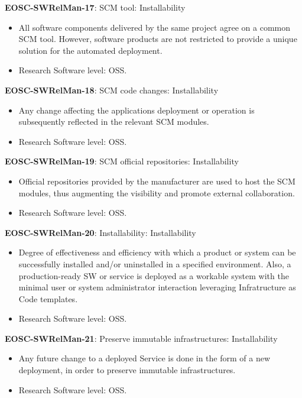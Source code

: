 \textbf{EOSC-SWRelMan-17}: SCM tool: Installability

\begin{itemize}
    \item All software components delivered by the same project agree on a common SCM tool. However, software products are not restricted to provide a unique solution for the automated deployment. \cite{orviz_set_2017}
    \item Research Software level: OSS.
\end{itemize}

\textbf{EOSC-SWRelMan-18}: SCM code changes: Installability

\begin{itemize}
    \item Any change affecting the applications deployment or operation is subsequently reflected in the relevant SCM modules. \cite{orviz_set_2017}
    \item Research Software level: OSS.
\end{itemize}

\textbf{EOSC-SWRelMan-19}: SCM official repositories: Installability

\begin{itemize}
    \item Official repositories provided by the manufacturer are used to host the SCM modules, thus augmenting the visibility and promote external collaboration. \cite{orviz_set_2017}
    \item Research Software level: OSS.
\end{itemize}

\textbf{EOSC-SWRelMan-20}: Installability: Installability

\begin{itemize}
    \item Degree of effectiveness and efficiency with which a product or system can be successfully installed and/or uninstalled in a specified environment. Also, a production-ready SW or service is deployed as a workable system with the minimal user or system administrator interaction leveraging Infratructure as Code templates. \cite{iso_25010_2011_2017,orviz_fernandez_eosc-synergy_2020}
    \item Research Software level: OSS.
\end{itemize}

\textbf{EOSC-SWRelMan-21}: Preserve immutable infrastructures: Installability

\begin{itemize}
    \item Any future change to a deployed Service is done in the form of a new deployment, in order to preserve immutable infrastructures. \cite{orviz_fernandez_eosc-synergy_2020}
    \item Research Software level: OSS.
\end{itemize}

